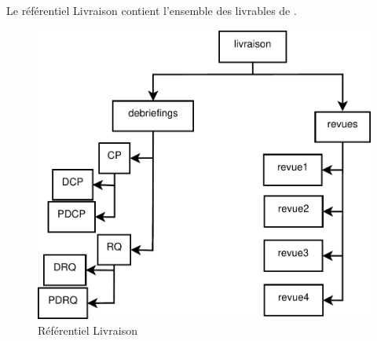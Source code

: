 Le référentiel Livraison contient l'ensemble des livrables de \nomEquipe{}.

\clearpage

\begin{figure}[ht]
         \begin{center}
         \includegraphics[scale=0.5]{images/arboLivraison}
         \end{center}
         \caption{Référentiel Livraison}
 \end{figure}






